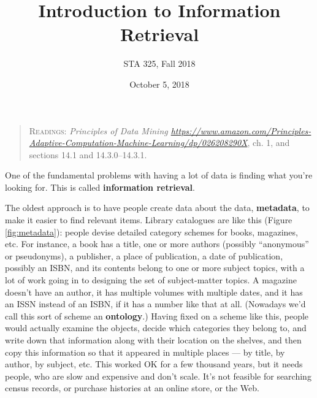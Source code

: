 \documentclass{article}
\begin{document}
\title{Introduction to Information Retrieval}
\author{STA 325, Fall 2018}
\date{October 5, 2018}
\maketitle

\begin{quotation}
  \textsc{Readings:} {\em Principles of Data Mining \url{https://www.amazon.com/Principles-Adaptive-Computation-Machine-Learning/dp/026208290X}}, ch. 1, and sections 14.1
  and 14.3.0--14.3.1.
\end{quotation}


One of the fundamental problems with having a lot of data is finding what
you're looking for.  This is called {\bf information retrieval}.

The oldest approach is to have people create data about the data, {\bf
  metadata}, to make it easier to find relevant items.  Library catalogues are
like this (Figure \ref{fig:metadata}): people devise detailed category schemes
for books, magazines, etc.  For instance, a book has a title, one or more
authors (possibly ``anonymous'' or pseudonyms), a publisher, a place of
publication, a date of publication, possibly an ISBN, and its contents belong
to one or more subject topics, with a lot of work going in to designing the set
of subject-matter topics.  A magazine doesn't have an author, it has multiple
volumes with multiple dates, and it has an ISSN instead of an ISBN, if it has a
number like that at all.  (Nowadays we'd call this sort of scheme an {\bf
  ontology}.)  Having fixed on a scheme like this, people would actually
examine the objects, decide which categories they belong to, and write down
that information along with their location on the shelves, and then copy this
information so that it appeared in multiple places --- by title, by author, by
subject, etc.  This worked OK for a few thousand years, but it needs people,
who are slow and expensive and don't scale.  It's not feasible for searching
census records, or purchase histories at an online store, or the Web.
\end{document}
